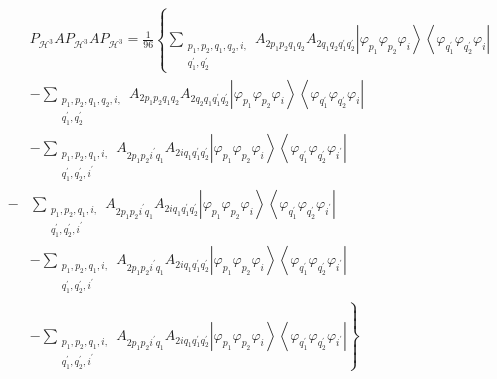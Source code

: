 \documentclass[aps,preprint]{revtex4}%
\begin{document}
\begin{align}
&  P_{\mathcal{H}^{3}}AP_{\mathcal{H}^{3}}AP_{\mathcal{H}^{3}}=\frac{1}%
{96}\left\{  \sum_{\substack{p_{1},p_{2},q_{1},q_{2},i,\\q_{1}^{\prime}%
,q_{2}^{\prime}}}A_{2p_{1}p_{2}q_{1}q_{2}}A_{2q_{1}q_{2}q_{1}^{\prime}%
q_{2}^{\prime}}\left\vert \varphi_{p_{1}}\varphi_{p_{2}}\varphi_{i}%
\right\rangle \left\langle \varphi_{q_{1}^{\prime}}\varphi_{q_{2}^{\prime}%
}\varphi_{i}\right\vert \right. \nonumber\\
&  -\sum_{\substack{p_{1},p_{2},q_{1},q_{2},i,\\q_{1}^{\prime},q_{2}^{\prime}%
}}A_{2p_{1}p_{2}q_{1}q_{2}}A_{2q_{2}q_{1}q_{1}^{\prime}q_{2}^{\prime}%
}\left\vert \varphi_{p_{1}}\varphi_{p_{2}}\varphi_{i}\right\rangle
\left\langle \varphi_{q_{1}^{\prime}}\varphi_{q_{2}^{\prime}}\varphi
_{i}\right\vert \\
&  -\sum_{\substack{p_{1},p_{2},q_{1},i,\\q_{1}^{\prime},q_{2}^{\prime
},i^{\prime}}}A_{2p_{1}p_{2}i^{\prime}q_{1}}A_{2iq_{1}q_{1}^{\prime}%
q_{2}^{\prime}}\left\vert \varphi_{p_{1}}\varphi_{p_{2}}\varphi_{i}%
\right\rangle \left\langle \varphi_{q_{1}^{\prime}}\varphi_{q_{2}^{\prime}%
}\varphi_{i^{\prime}}\right\vert \\
-  &  \sum_{\substack{p_{1},p_{2},q_{1},i,\\q_{1}^{\prime},q_{2}^{\prime
},i^{\prime}}}A_{2p_{1}p_{2}i^{\prime}q_{1}}A_{2iq_{1}q_{1}^{\prime}%
q_{2}^{\prime}}\left\vert \varphi_{p_{1}}\varphi_{p_{2}}\varphi_{i}%
\right\rangle \left\langle \varphi_{q_{1}^{\prime}}\varphi_{q_{2}^{\prime}%
}\varphi_{i^{\prime}}\right\vert \\
&  -\sum_{\substack{p_{1},p_{2},q_{1},i,\\q_{1}^{\prime},q_{2}^{\prime
},i^{\prime}}}A_{2p_{1}p_{2}i^{\prime}q_{1}}A_{2iq_{1}q_{1}^{\prime}%
q_{2}^{\prime}}\left\vert \varphi_{p_{1}}\varphi_{p_{2}}\varphi_{i}%
\right\rangle \left\langle \varphi_{q_{1}^{\prime}}\varphi_{q_{2}^{\prime}%
}\varphi_{i^{\prime}}\right\vert \\
&  \left.  -\sum_{\substack{p_{1},p_{2},q_{1},i,\\q_{1}^{\prime},q_{2}%
^{\prime},i^{\prime}}}A_{2p_{1}p_{2}i^{\prime}q_{1}}A_{2iq_{1}q_{1}^{\prime
}q_{2}^{\prime}}\left\vert \varphi_{p_{1}}\varphi_{p_{2}}\varphi
_{i}\right\rangle \left\langle \varphi_{q_{1}^{\prime}}\varphi_{q_{2}^{\prime
}}\varphi_{i^{\prime}}\right\vert \right\}
\end{align}%
\end{document}
